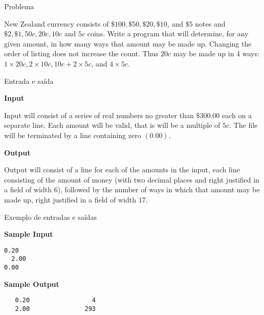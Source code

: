 
\begin{frame}[fragile]{Problema}

New Zealand currency consists of $\$100, \$50, \$20, \$10$, and $\$5$ notes and $\$2, \$1, 50c,
20c, 10c$ and $5c$ coins. Write a program that will determine, for any given amount, in how many
ways that amount may be made up. Changing the order of listing does not increase the count. Thus
$20c$ may be made up in $4$ ways: $1\times 20c, 2\times 10c, 10c+2\times 5c$, and $4\times 5c$.

\end{frame}

\begin{frame}[fragile]{Entrada e saída}

\textbf{Input}

Input will consist of a series of real numbers no greater than $\$300.00$ each on a separate line.
Each amount will be valid, that is will be a multiple of $5c$. The file will be terminated by a
line containing zero $(0.00)$.

\vspace{0.2in}

\textbf{Output}

Output will consist of a line for each of the amounts in the input, each line consisting of the
amount of money (with two decimal places and right justified in a field of width $6$), followed by
the number of ways in which that amount may be made up, right justified in a field of width $17$.

\end{frame}

\begin{frame}[fragile]{Exemplo de entradas e saídas}

\begin{minipage}[t]{0.45\textwidth}
\textbf{Sample Input}
\begin{verbatim}
0.20
  2.00
0.00
\end{verbatim}
\end{minipage}
\begin{minipage}[t]{0.5\textwidth}
\textbf{Sample Output}
\begin{verbatim}
   0.20                 4
   2.00               293
\end{verbatim}
\end{minipage}
\end{frame}

